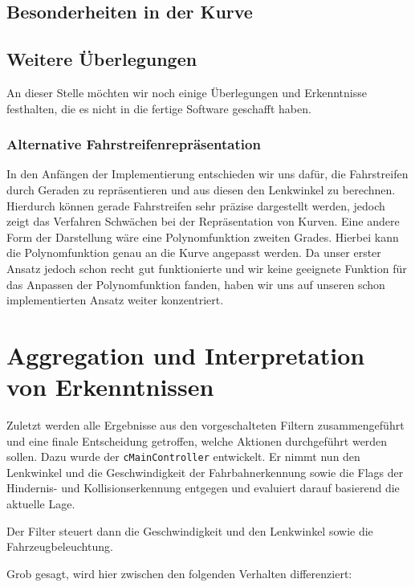 \documentclass[a4paper,12pt]{report}
\begin{document}
\section{Besonderheiten in der Kurve}
	

\section{Weitere Überlegungen}

	An dieser Stelle möchten wir noch einige Überlegungen und Erkenntnisse festhalten,
	die es nicht in die fertige Software geschafft haben.

\subsection{Alternative Fahrstreifenrepräsentation}

	In den Anfängen der Implementierung entschieden wir uns dafür, die Fahrstreifen durch Geraden zu repräsentieren und aus diesen den Lenkwinkel zu berechnen.
	Hierdurch können gerade Fahrstreifen sehr präzise dargestellt werden, jedoch zeigt das Verfahren Schwächen bei der Repräsentation von Kurven.
	Eine andere Form der Darstellung wäre eine Polynomfunktion zweiten Grades.
	Hierbei kann die Polynomfunktion genau an die Kurve angepasst werden.
	Da unser erster Ansatz jedoch schon recht gut funktionierte und wir keine geeignete Funktion für das Anpassen der Polynomfunktion fanden, haben wir uns auf unseren schon implementierten Ansatz weiter konzentriert.

\chapter{Aggregation und Interpretation von Erkenntnissen}

	Zuletzt werden alle Ergebnisse aus den vorgeschalteten Filtern zusammengeführt und eine finale Entscheidung getroffen, welche Aktionen durchgeführt werden sollen.
	Dazu wurde der \texttt{cMainController} entwickelt. Er nimmt nun den Lenkwinkel und die Geschwindigkeit der Fahrbahnerkennung sowie die Flags der Hindernis- und Kollisionserkennung entgegen und evaluiert darauf basierend die aktuelle Lage.

	Der Filter steuert dann die Geschwindigkeit und den Lenkwinkel sowie die Fahrzeugbeleuchtung.

	Grob gesagt, wird hier zwischen den folgenden Verhalten differenziert:
\end{document}
